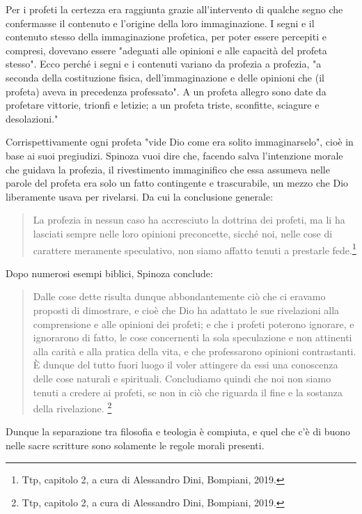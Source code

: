 Per i profeti la certezza era raggiunta
 grazie all'intervento di qualche segno che confermasse il contenuto e l'origine della loro
immaginazione. I segni e il contenuto stesso della
immaginazione profetica, per poter essere percepiti e compresi, dovevano essere "adeguati alle
opinioni e alle capacità del profeta stesso". Ecco perché i segni e i contenuti variano da profezia a
profezia, "a seconda della costituzione fisica, dell'immaginazione e delle opinioni che (il profeta)
aveva in precedenza professato". A un profeta allegro sono date da profetare vittorie, trionfi e
letizie; a un profeta triste, sconfitte, sciagure e desolazioni."

Corrispettivamente ogni profeta "vide Dio come era solito immaginarselo", cioè in base ai suoi
pregiudizi. Spinoza vuoi dire che, facendo salva l'intenzione morale che guidava la profezia, il rivestimento immaginifico che essa assumeva nelle parole del profeta era solo un
fatto contingente e trascurabile, un mezzo che Dio liberamente usava per rivelarsi. Da cui la
conclusione generale: 

\begin{quotation}
	\small La profezia in nessun caso ha accresciuto la dottrina dei profeti, ma li ha
	lasciati sempre nelle loro opinioni preconcette, sicché noi, nelle cose di carattere meramente
	speculativo, non siamo affatto tenuti a prestarle fede.\footnote{Ttp, capitolo 2, a cura di Alessandro Dini, Bompiani, 2019.}
\end{quotation}

Dopo numerosi esempi biblici, Spinoza conclude:

\begin{quotation}
	\small Dalle cose dette risulta dunque abbondantemente ciò che ci eravamo proposti di
	dimostrare, e cioè che Dio ha adattato le sue rivelazioni alla comprensione e alle opinioni dei
	profeti; e che i profeti poterono ignorare, e ignorarono di fatto, le cose concernenti la sola
	speculazione e non attinenti alla carità e alla pratica della vita, e che professarono opinioni
	contrastanti. È dunque del tutto fuori luogo il voler attingere da essi una conoscenza delle cose
	naturali e spirituali. Concludiamo quindi che noi non siamo tenuti a credere ai profeti, se non in ciò
	che riguarda il fine e la sostanza della rivelazione. \footnote{Ttp, capitolo 2, a cura di Alessandro Dini, Bompiani, 2019.}
\end{quotation}

Dunque la separazione tra filosofia e teologia è compiuta, e quel che c'è di buono nelle sacre scritture sono solamente le regole morali presenti.

